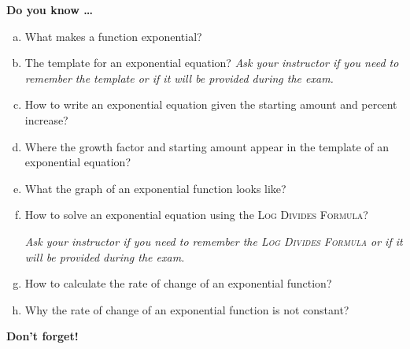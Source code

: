 \newpage




\noindent \textbf{Do you know \ldots} %

\begin{enumerate} [(a)]
\item What makes a function exponential? 
\item The template for an exponential equation? \emph{Ask your instructor if you need to remember the template or if it will be provided during the exam.} 
\item How to write an exponential equation given the starting amount and percent increase?     
\item Where the growth factor and starting amount appear in the template of an exponential equation?  
\item What the graph of an exponential function looks like?  
\item How to solve an exponential equation using the \textsc{Log Divides Formula}?   

\emph{Ask your instructor if you need to remember the \textsc{Log Divides Formula} or if it will be provided during the exam.}  
\item How to calculate the rate of change of an exponential function?     
\item Why the rate of change of an exponential function is not constant?   
\end{enumerate}


\noindent \textbf{Don't forget!}
